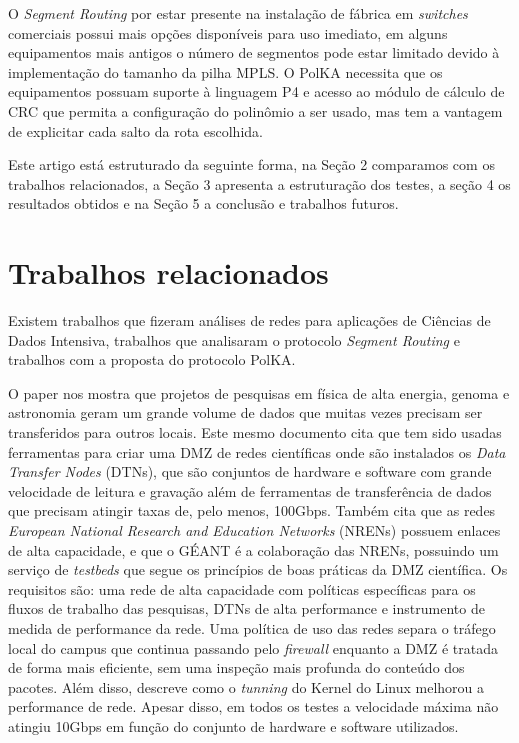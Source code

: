 \documentclass[12pt]{article}
\begin{document}
O \textit{Segment Routing} por estar presente na instalação de fábrica em \textit{switches} comerciais possui mais opções disponíveis para uso imediato, em alguns equipamentos mais antigos o número de segmentos pode estar limitado devido à implementação do tamanho da pilha MPLS. O PolKA necessita que os equipamentos possuam suporte à linguagem P4 e acesso ao módulo de cálculo de CRC que permita a configuração do polinômio a ser usado, mas tem a vantagem de explicitar cada salto da rota escolhida.


Este artigo está estruturado da seguinte forma, na Seção 2 comparamos com os trabalhos relacionados, a Seção 3 apresenta a estruturação dos testes, a seção 4 os resultados obtidos e na Seção 5 a conclusão e trabalhos futuros.

\section{Trabalhos relacionados}

Existem trabalhos que fizeram análises de redes para aplicações de Ciências de Dados Intensiva, trabalhos que analisaram o protocolo \textit{Segment Routing} e trabalhos com a proposta do protocolo PolKA.

O paper \cite{ioannou2020data} nos mostra que projetos de pesquisas em física de alta energia, genoma e astronomia geram um grande volume de dados que muitas vezes precisam ser transferidos para outros locais. Este mesmo documento cita que tem sido usadas ferramentas para criar uma DMZ de redes científicas onde são instalados os \textit{Data Transfer Nodes} (DTNs), que são conjuntos de hardware e software com grande velocidade de leitura e gravação além de ferramentas de transferência de dados que precisam atingir taxas de, pelo menos, 100Gbps. Também cita que as redes \textit{European National Research and Education Networks} (NRENs) possuem enlaces de alta capacidade, e que o GÉANT é a colaboração das NRENs, possuindo um serviço de \textit{testbeds} que segue os princípios de boas práticas da DMZ científica. Os requisitos são: uma rede de alta capacidade com políticas específicas para os fluxos de trabalho das pesquisas, DTNs de alta performance e instrumento de medida de performance da rede. Uma política de uso das redes separa o tráfego local do campus que continua passando pelo \textit{firewall} enquanto a DMZ é tratada de forma mais eficiente, sem uma inspeção mais profunda do conteúdo dos pacotes. Além disso, descreve como o \textit{tunning} do Kernel do Linux melhorou a performance de rede. Apesar disso, em todos os testes a velocidade máxima não atingiu 10Gbps em função do conjunto de hardware e software utilizados.
\end{document}
